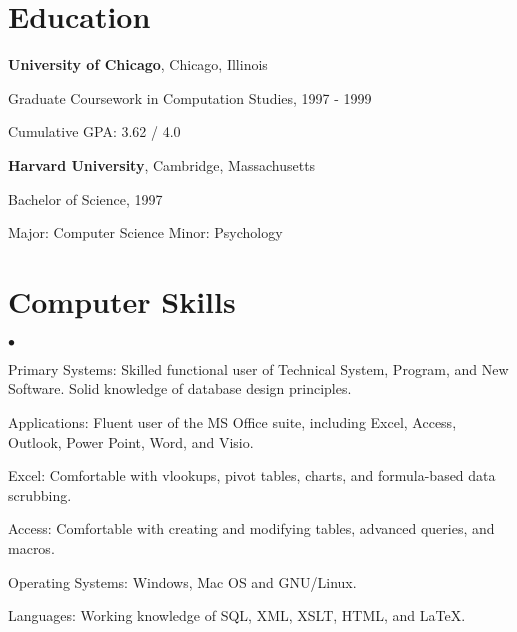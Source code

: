 \documentclass[margin,line]{res}
\newenvironment{list1}{
  \begin{list}{\ding{113}}{%
      \setlength{\itemsep}{0in}
      \setlength{\parsep}{0in} \setlength{\parskip}{0in}
      \setlength{\topsep}{0in} \setlength{\partopsep}{0in} 
      \setlength{\leftmargin}{0.17in}}}{\end{list}}
\newenvironment{list2}{
  \begin{list}{$\bullet$}{%
      \setlength{\itemsep}{0in} 
      \setlength{\parsep}{0in} \setlength{\parskip}{0in}
      \setlength{\topsep}{0in} \setlength{\partopsep}{0in} 
      \setlength{\leftmargin}{0.2in}}}{\end{list}}
\begin{document}
\begin{resume}
\section{\sc Education}
{\bf University of Chicago}, Chicago, Illinois \\ 
\vspace{-.3cm}
\begin{list1}
\item[] Graduate Coursework in Computation Studies, 1997 - 1999
\item[] Cumulative GPA: 3.62 / 4.0
\end{list1}

\vspace*{.05in}
{\bf Harvard University}, Cambridge, Massachusetts \\
\vspace{-.3cm}
\begin{list1}
\item[] Bachelor of Science, 1997
\item[] Major: Computer Science Minor: Psychology
\end{list1}

\section{\sc Computer Skills} 
\begin{list2}
\item Primary Systems: Skilled functional user of Technical System, Program, and 
New Software. Solid knowledge of database design principles.
\item Applications: Fluent user of the MS Office suite, including Excel, Access, 
Outlook, Power Point, Word, and Visio.  
\item[] Excel: Comfortable with vlookups, pivot tables, charts, and 
formula-based data scrubbing.
\item[] Access: Comfortable with creating and modifying tables, advanced 
queries, and macros.
\item Operating Systems:  Windows, Mac OS and GNU/Linux.
\item Languages: Working knowledge of SQL, XML, XSLT, HTML, and \LaTeX.
\end{list2}


\end{resume}
\end{document}
